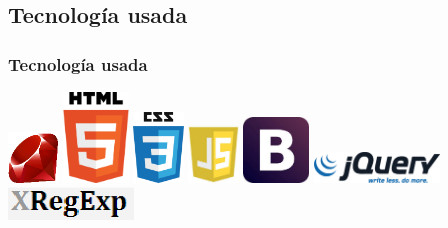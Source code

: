 \documentclass{beamer}
\begin{document}
\subsection{Tecnología usada}
\begin{frame}
  \frametitle{Tecnología usada}
  
  \includegraphics[width=0.1\textwidth]{img/ruby.eps}
  \hspace*{1.2cm}
  \includegraphics[width=0.13\textwidth]{img/HTML5.eps}
  \hspace*{1.2cm}
  \includegraphics[width=0.1\textwidth]{img/css3.eps}
  \hspace*{1.2cm}
  \includegraphics[width=0.1\textwidth]{img/js.eps}
  \hspace*{1.2cm}
  \includegraphics[width=0.13\textwidth]{img/bootstrap.eps}
  \newline
  \newline
  \includegraphics[width=0.25\textwidth]{img/jquery.eps}
  \hspace*{1.2cm}
  \includegraphics[width=0.25\textwidth]{img/xregexp.eps}
  \hspace*{1.2cm}

\end{frame}
\end{document}
